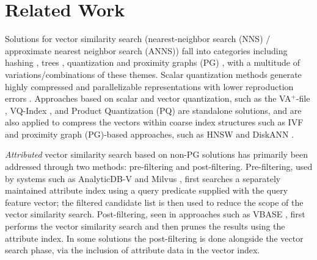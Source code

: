 \section{Related Work}
\label{s:4-squash-related-work}

Solutions for vector similarity search (nearest-neighbor search (NNS) / approximate nearest neighbor search (ANNS)) fall into categories including hashing \cite{db-lsh-hashing-2, AndoniOptimal-Hashing-3, ANN-Hashing-5, IntelligentProbingLv-Hashing-8, ParkNeighbor-Hashing-9, PM-LSH-Hashing-11}, trees \cite{HouleRankBasedTree, LuVHPHypersphere, Muja2014ScalableNN, SilpaAnan2008OptimizedKDTree}, quantization \cite{ferhatosmanoglu2001approximate, TuncelFerhatosmanoglu2002VQIndex, Ferhatosmanoglu2006VAPlusApprox, Jegou2011PQ, OptimizedProductQuantization, Wang2020DeltaPQ, VarianceAwareQuantization, Aguerrebere2023, aguerrebere2024locallyadaptivequantizationstreamingvector, PQCacheLocality2015, RabitQ2024} and proximity graphs (PG) \cite{FuFastApproximate, Gollapudi2023FilteredDiskANN, NEURIPS2019-DISKANN, Jaiswal2022OODDiskANN, MALKOV201461, Malkov2020HNSW, singh2021freshdiskannfastaccurategraphbased, Zhao2020SONGGPU}, with a multitude of variations/combinations of these themes. 
Scalar quantization methods generate highly compressed and parallelizable representations with lower reproduction errors \cite{douze2024faisslibraryivfsq8}. 
Approaches based on scalar and vector quantization, such as the VA$^+$-file \cite{Ferhatosmanoglu2000VAPlus}, VQ-Index \cite{TuncelFerhatosmanoglu2002VQIndex}, and Product Quantization (PQ) \cite{Jegou2011PQ} are standalone solutions, and are also applied to compress the vectors within coarse index structures such as IVF \cite{TuncelFerhatosmanoglu2002VQIndex, douze2024faisslibraryivfsq8} and proximity graph (PG)-based approaches, such as HNSW \cite{Malkov2020HNSW, FaissMissingManual} and DiskANN \cite{NEURIPS2019-DISKANN}.


\textit{Attributed} vector similarity search based on non-PG solutions has primarily been addressed through two methods: pre-filtering and post-filtering. 
Pre-filtering, used by systems such as AnalyticDB-V \cite{Wei2020AnalyticDBV} and Milvus \cite{Wang2021Milvus}, first searches a separately maintained attribute index using a query predicate supplied with the query feature vector; the filtered candidate list is then used to reduce the scope of the vector similarity search. 
Post-filtering, seen in approaches such as VBASE \cite{Zhang2023VBASE}, first performs the vector similarity search and then prunes the results using the attribute index. 
In some solutions the post-filtering is done alongside the vector search phase, via the inclusion of attribute data in the vector index. 

